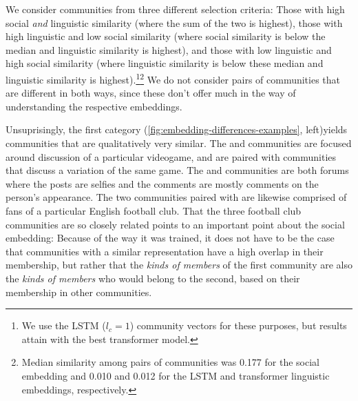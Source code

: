 \documentclass[11pt]{article}
\begin{document}
We consider communities from three different selection criteria: 
Those with high social \emph{and} linguistic similarity 
(where the sum of the two is highest),
those with high linguistic and low social similarity
(where social similarity is below the median and linguistic similarity is highest), and
those with low linguistic and high social similarity
(where linguistic similarity is below these median and linguistic similarity is highest).\footnote{We use the LSTM ($l_c=1$) community vectors for these purposes, 
  but results attain with the best transformer model.}\footnote{Median similarity
  among pairs of communities was \num{0.177} for the social embedding
  and \num{0.010} and \num{0.012} for the LSTM and transformer
  linguistic embeddings, respectively.}
We do not consider pairs of communities that are different in both ways,
since these don't offer much in the way of understanding the respective embeddings.

Unsuprisingly, the first category (\cref{fig:embedding-differences-examples}, left)yields communities that are qualitatively very similar. 
The  and  communities are focused
around discussion of a particular videogame, and are paired
with communities that discuss a variation of the same game.
The  and  communities are both 
forums where the posts are selfies and the comments are mostly 
comments on the person's appearance.
The two communities paired with  are 
likewise comprised of fans of a particular English football club.
That the three football club communities are so closely related points
to an important point about the social embedding: Because of the way
it was trained, it does not have to be the case that communities with
a similar representation have a high overlap in their membership,
but rather that the \emph{kinds of members} of the first community
are also the \emph{kinds of members} who would belong to the second, 
based on their membership in other communities.
\end{document}
